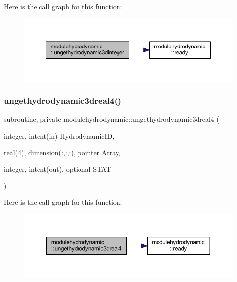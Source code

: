 Here is the call graph for this function\+:\nopagebreak
\begin{figure}[H]
\begin{center}
\leavevmode
\includegraphics[width=350pt]{namespacemodulehydrodynamic_aeb1abec5f84ff629b6a72c2c9955c7af_cgraph}
\end{center}
\end{figure}
\mbox{\label{namespacemodulehydrodynamic_a624a2d0694d918e1923e5b6464802fce}} 
\subsubsection{\texorpdfstring{ungethydrodynamic3dreal4()}{ungethydrodynamic3dreal4()}}
{\footnotesize\ttfamily subroutine, private modulehydrodynamic\+::ungethydrodynamic3dreal4 (\begin{DoxyParamCaption}\item[{integer, intent(in)}]{Hydrodynamic\+ID,  }\item[{real(4), dimension(\+:,\+:,\+:), pointer}]{Array,  }\item[{integer, intent(out), optional}]{S\+T\+AT }\end{DoxyParamCaption})\hspace{0.3cm}{\ttfamily [private]}}

Here is the call graph for this function\+:\nopagebreak
\begin{figure}[H]
\begin{center}
\leavevmode
\includegraphics[width=350pt]{namespacemodulehydrodynamic_a624a2d0694d918e1923e5b6464802fce_cgraph}
\end{center}
\end{figure}
\mbox{\label{namespacemodulehydrodynamic_afc2a72c29bd11cd7048168f6275a3938}} 
